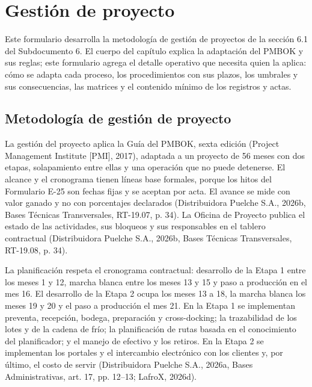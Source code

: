\documentclass[carta,firma,final]{lafrox}
\begin{document}
\portadalafrox
\preliminareslafrox

\renewcommand{\thetable}{T-9.\arabic{table}}
\renewcommand{\thefigure}{T-9.\arabic{figure}}
\renewcommand{\thesection}{\arabic{section}}
\renewcommand{\thesubsection}{\thesection.\arabic{subsection}}


\chapter{Gestión de proyecto}

Este formulario desarrolla la metodología de gestión de proyectos de la sección 6.1 del Subdocumento 6. El cuerpo del capítulo explica la adaptación del PMBOK y sus reglas; este formulario agrega el detalle operativo que necesita quien la aplica: cómo se adapta cada proceso, los procedimientos con sus plazos, los umbrales y sus consecuencias, las matrices y el contenido mínimo de los registros y actas.

\section{Metodología de gestión de proyecto}

La gestión del proyecto aplica la Guía del PMBOK, sexta edición (Project Management Institute [PMI], 2017), adaptada a un proyecto de 56 meses con dos etapas, solapamiento entre ellas y una operación que no puede detenerse. El alcance y el cronograma tienen líneas base formales, porque los hitos del Formulario E-25 son fechas fijas y se aceptan por acta. El avance se mide con valor ganado y no con porcentajes declarados (Distribuidora Puelche S.A., 2026b, Bases Técnicas Transversales, RT-19.07, p. 34). La Oficina de Proyecto publica el estado de las actividades, sus bloqueos y sus responsables en el tablero contractual (Distribuidora Puelche S.A., 2026b, Bases Técnicas Transversales, RT-19.08, p. 34).

La planificación respeta el cronograma contractual: desarrollo de la Etapa 1 entre los meses 1 y 12, marcha blanca entre los meses 13 y 15 y paso a producción en el mes 16. El desarrollo de la Etapa 2 ocupa los meses 13 a 18, la marcha blanca los meses 19 y 20 y el paso a producción el mes 21. En la Etapa 1 se implementan preventa, recepción, bodega, preparación y cross-docking; la trazabilidad de los lotes y de la cadena de frío; la planificación de rutas basada en el conocimiento del planificador; y el manejo de efectivo y los retiros. En la Etapa 2 se implementan los portales y el intercambio electrónico con los clientes y, por último, el costo de servir (Distribuidora Puelche S.A., 2026a, Bases Administrativas, art. 17, pp. 12--13; LafroX, 2026d).
\end{document}
